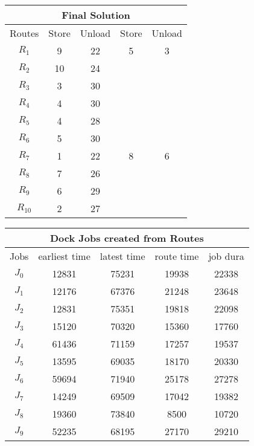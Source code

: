 \documentclass[11pt,paper=a4,parskip=half+]{article}
\begin{document}
\begin{tabular}{ | c || c | c | c | c |}
\hline
\multicolumn{5}{|c|}{Final Solution} \\
\hline
Routes & Store & Unload & Store & Unload \\
\hline
$R_1$ & 9 & 22 & 5 & 3 \\
$R_{2}$& 10 & 24 & & \\
$R_3$ & 3 & 30 & & \\
$R_4$ & 4 & 30 & & \\
$R_5$ & 4 & 28 & &  \\
$R_6$ & 5 & 30 & &  \\
$R_7$ & 1 & 22 & 8 & 6 \\
$R_8$ & 7 & 26 & &  \\
$R_9$ & 6 & 29 &  &  \\
$R_{10}$& 2 & 27 & &  \\
\hline
\end{tabular}

\bigskip

\begin{tabular}{ | c || c | c | c | c |}
\hline
\multicolumn{5}{|c|}{Dock Jobs created from Routes} \\
\hline
Jobs & earliest time & latest time & route time & job dura \\
\hline
$J_0$ & 12831  & 75231  & 19938    &  22338   \\ 
$J_1$ & 12176  & 67376  & 21248    &  23648   \\ 
$J_2$ & 12831  & 75351  & 19818    &  22098   \\ 
$J_3$ & 15120  & 70320  & 15360    &  17760   \\ 
$J_4$ & 61436  & 71159  & 17257    &  19537   \\ 
$J_5$ & 13595  & 69035  & 18170    &  20330   \\ 
$J_6$ & 59694  & 71940  & 25178    &  27278   \\ 
$J_7$ & 14249  & 69509  & 17042    &  19382   \\ 
$J_8$ & 19360  & 73840  & 8500     &  10720   \\ 
$J_{9}$ & 52235  & 68195  & 27170    &  29210 \\ 
\hline
\end{tabular}
\end{document}
